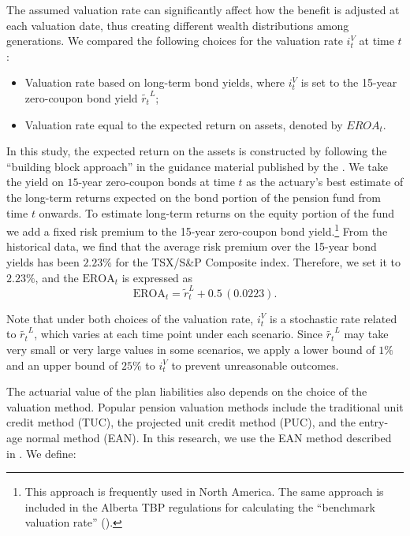 \documentclass{sfuthesis}
\numberwithin{equation}{chapter}
\begin{document}
		\justify
		The assumed valuation rate can significantly affect how the benefit is adjusted at each valuation date, thus creating different wealth distributions among generations. We compared the following choices for the valuation rate $i_{t}^V$ at time $t$:
		\begin{itemize}
			\item Valuation rate based on long-term bond yields, where $i_{t}^{V}$ is set to the 15-year zero-coupon bond yield $\tilde{r_{t}}^L$;
			\item Valuation rate equal to the expected return on assets, denoted by $EROA_{t}$.
		\end{itemize}
		In this study, the expected return on the assets is constructed by following the ``building block approach'' in the guidance material published by the \citet{cia2015a}. We take the yield on $15$-year zero-coupon bonds at time $t$ as the actuary's best estimate of the long-term returns expected on the bond portion of the pension fund from time $t$ onwards. To estimate long-term returns on the equity portion of the fund we add a fixed risk premium to the 15-year zero-coupon bond yield.\footnote{This approach is frequently used in North America. The same approach is included in the Alberta TBP regulations for calculating the ``benchmark valuation rate'' (\citet{Alberta2014}).} From the historical data, we find that the average risk premium over the 15-year bond yields has been $2.23\%$ for the TSX/S\&P Composite index. Therefore, we set it to $2.23\%$, and the $\text{EROA}_t$ is expressed as
		\begin{equation}
		\label{eq:STBP_20}
		\text{EROA}_t = \tilde{r}_{t}^L + 0.5\, (0.0223).
		\end{equation}
	
	
		\justify
		Note that under both choices of the valuation rate, $i_{t}^V$ is a stochastic rate related to $\tilde{r_{t}}^L$, which varies at each time point under each scenario. Since $\tilde{r_{t}}^L$ may take very small or very large values in some scenarios, we apply a lower bound of $1\%$ and an upper bound of $25\%$ to $i_{t}^{V}$ to prevent unreasonable outcomes. 
	
	
		\justify
		The actuarial value of the plan liabilities also depends on the choice of the valuation method. Popular pension valuation methods include the traditional unit credit method (TUC), the projected unit credit method (PUC), and the entry-age normal method (EAN). In this research, we use the EAN method described in \citet{Aitken1996}. We define: 
		
\end{document}
